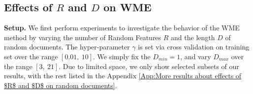 \documentclass[11pt,a4paper]{article}
\newcommand{\1}{\boldsymbol{1}}
\begin{document}
\subsection{Effects of $R$ and $D$ on WME}
\label{sec:Effects of R and D on Random Features}

\noindent
\textbf{Setup.} We first perform experiments to investigate the behavior of the WME method by varying the number of Random Features $R$ and the length $D$ of random documents. The hyper-parameter $\gamma$ is set via cross validation on training set over the range $[0.01, \ 10]$. We simply fix the $D_{min}=1$, and vary $D_{max}$ over the range $[3, \ 21]$. Due to limited space, we only show selected subsets of our results, with the rest listed in the Appendix \ref{App:More results about effects of $R$ and $D$ on random documents}. 
\end{document}
